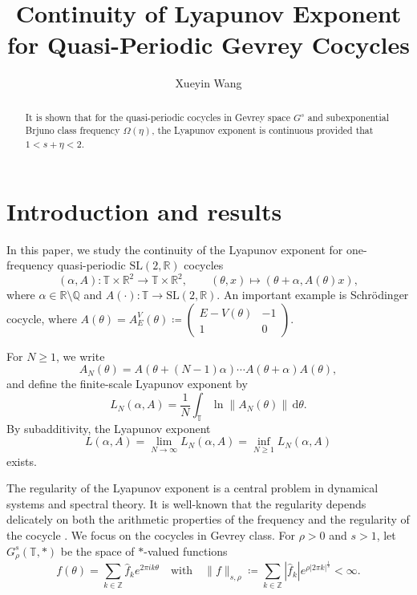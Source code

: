 \documentclass[reqno,12pt]{amsart}
\title[Lyapunov Exponent for Gevrey Cocycles]{Continuity of Lyapunov Exponent for Quasi-Periodic Gevrey Cocycles}
\author[X.\ Wang]{Xueyin Wang}
\theoremstyle{plain}
\theoremstyle{definition}
\numberwithin{equation}{section}
\begin{document}
\begin{abstract}
	It is shown that for the quasi-periodic cocycles in Gevrey space $G^{s}$ and subexponential Brjuno class frequency $\Omega(\eta)$, the Lyapunov exponent is continuous provided that $1<s+\eta<2$.
\end{abstract}

\maketitle	

\section{Introduction and results}
In this paper, we study the continuity of the Lyapunov exponent for one-frequency quasi-periodic $\mathrm{SL}(2,\mathbb{R})$ cocycles
\begin{equation*}
    (\alpha,A):\mathbb{T}\times \mathbb{R}^{2}\rightarrow \mathbb{T}\times \mathbb{R}^{2},\qquad (\theta, x)\mapsto (\theta+\alpha, A(\theta)x),
\end{equation*}
where $\alpha\in\mathbb{R}\setminus\mathbb{Q}$ and $A(\cdot): \mathbb{T}\to \mathrm{SL}(2,\mathbb{R})$. An important example is Schr\"odinger cocycle, where $A(\theta)=A_{E}^{V}(\theta)\coloneq\begin{pmatrix}
    E-V(\theta)&-1\\1&0
\end{pmatrix}$.

For $N\geqslant 1$, we write
\begin{equation*}
    A_{N}(\theta)=A(\theta+(N-1)\alpha)\cdots A(\theta+\alpha)A(\theta),
\end{equation*}
and define the finite-scale Lyapunov exponent by
\begin{equation*}
    L_{N}(\alpha,A)= \frac{1}{N}\int_{\mathbb{T}} \ln \|A_{N}(\theta)\| \, \mathrm{d}\theta.
\end{equation*}
By subadditivity, the Lyapunov exponent
\begin{equation*}
    L(\alpha,A)= \lim_{N\to\infty} L_{N}(\alpha,A)=\inf_{N\geqslant 1}L_{N}(\alpha,A)
\end{equation*}
exists.

The regularity of the Lyapunov exponent is a central problem in  dynamical systems and spectral theory. It is well-known that the regularity depends delicately on both the arithmetic properties of the frequency and the regularity of the cocycle \cite{youproblems}. We focus on the cocycles in Gevrey class. For $\rho>0$ and $s>1$,
let $G^{s}_{\rho}(\mathbb{T},*)$ be the space of $*$-valued functions
\begin{equation*}
    f(\theta)=\sum_{k\in\mathbb Z} \hat{f}_{k} e^{2\pi i k\theta}\quad \text{with}\quad \|f\|_{s,\rho}\coloneq \sum_{k\in\mathbb{Z}} |\hat{f}_{k}|e^{\rho|2\pi k|^{\frac{1}{s}}}<\infty.
\end{equation*}
\end{document}
